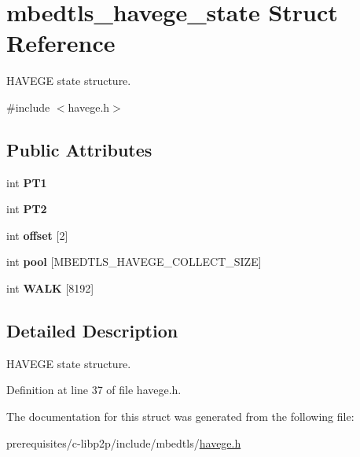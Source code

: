 \hypertarget{structmbedtls__havege__state}{}\section{mbedtls\+\_\+havege\+\_\+state Struct Reference}
\label{structmbedtls__havege__state}


H\+A\+V\+E\+GE state structure.  




{\ttfamily \#include $<$havege.\+h$>$}

\subsection*{Public Attributes}
\begin{DoxyCompactItemize}
\item 
\mbox{\label{structmbedtls__havege__state_adac07bcb4556e5831b0a1345fb4484ea}} 
int {\bfseries P\+T1}
\item 
\mbox{\label{structmbedtls__havege__state_ae0f660e103c23be2036ad0831052da2d}} 
int {\bfseries P\+T2}
\item 
\mbox{\label{structmbedtls__havege__state_a5e52d25e8ccf40df7069abdc5d8ac522}} 
int {\bfseries offset} \mbox{[}2\mbox{]}
\item 
\mbox{\label{structmbedtls__havege__state_a4abcd9c2f5e3dd42e264dfffdc2f17d9}} 
int {\bfseries pool} \mbox{[}M\+B\+E\+D\+T\+L\+S\+\_\+\+H\+A\+V\+E\+G\+E\+\_\+\+C\+O\+L\+L\+E\+C\+T\+\_\+\+S\+I\+ZE\mbox{]}
\item 
\mbox{\label{structmbedtls__havege__state_a14de6a4b46e53b88f36c82069042a99e}} 
int {\bfseries W\+A\+LK} \mbox{[}8192\mbox{]}
\end{DoxyCompactItemize}


\subsection{Detailed Description}
H\+A\+V\+E\+GE state structure. 

Definition at line 37 of file havege.\+h.



The documentation for this struct was generated from the following file\+:\begin{DoxyCompactItemize}
\item 
prerequisites/c-\/libp2p/include/mbedtls/\mbox{\hyperlink{havege_8h}{havege.\+h}}\end{DoxyCompactItemize}
